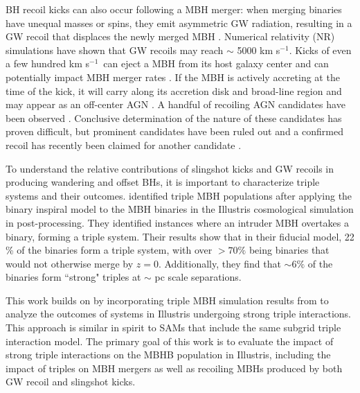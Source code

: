 \documentclass[twocolumn,linenumbers]{aastex701}
\newcommand{\kms}{km s$^{-1}$}
\begin{document}
BH recoil kicks can also occur following a MBH merger: when merging binaries have unequal masses or spins, they emit asymmetric GW 
radiation, resulting in a GW recoil that displaces the newly merged MBH \citep[e.g.,][]{bekenstein_gravitational-radiation_1973, Campanelli_2007}. Numerical relativity (NR) simulations have shown that GW recoils may reach $\sim$ 5000 \kms \citep{Campanelli_2007,lousto_orbital_2011}. Kicks of even a few hundred \kms\ can eject a MBH from its host galaxy center \citep{Lousto_2012, Gerosa_2014, Schnittman_2007, Ricarte2021} and can potentially impact MBH merger rates  \citep{Sesana_2009}. If the MBH is actively accreting at the time of the kick, it will carry along its accretion disk and broad-line region and may appear as an off-center AGN \citep{Loeb_2007,blecha_effects_2008, Volonteri_2008, Komossa_2012}. A handful of  recoiling AGN candidates have been observed \citep{Komossa2008,Civano2010,Koss2014,Kalfountzou2017,Chiaberge_2017,Hogg_2021,Ward2021,vanDokkum2023,bigmac2024,Uppal_2024}. Conclusive determination of the nature of these candidates has proven difficult, but prominent candidates have been ruled out \citep{Decarli2014,Li2024} and a confirmed recoil has recently been claimed for another candidate \citep{chiaberge2025}. 

To understand the relative contributions of slingshot kicks and GW recoils in producing wandering and offset BHs, it is important to characterize triple systems and their outcomes. \citet{sayeb_mbh_2023} identified triple MBH populations after applying the binary inspiral model \citet{Kelley_2017a} to the MBH binaries in the Illustris cosmological simulation in post-processing. They identified 
instances where an intruder MBH overtakes a binary, forming a triple system. Their results show that in their fiducial model,
22 \% of the binaries form a triple system, with over $> 70 \%$ being binaries that would not otherwise merge by $z=0$. Additionally, they find that $\sim 6 \%$ of the binaries form ``strong" triples at $\sim$ pc scale separations. 

This work builds on \citet{sayeb_mbh_2023} by incorporating triple MBH simulation results from \citet{bonetti_post-newtonian_2018-1} to analyze the outcomes of systems in Illustris undergoing strong triple interactions. This approach is similar in spirit to SAMs \citep{bonetti_post-newtonian_2018,bonetti_post-newtonian_2019,Izquierdo_Villalba_2021} that include the same subgrid triple interaction model. The primary goal of this work is to evaluate the impact of strong triple interactions on the MBHB population in Illustris, including the impact of triples on MBH mergers as well as recoiling MBHs produced by both GW recoil and slingshot kicks.
\end{document}

